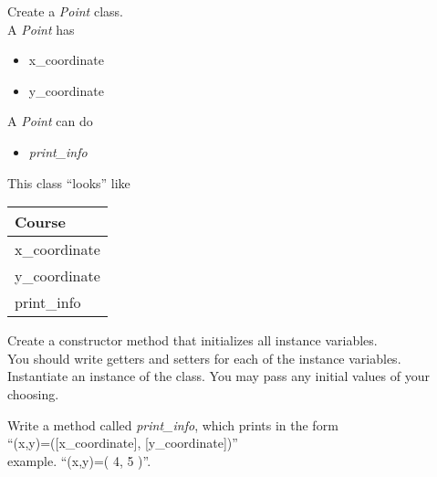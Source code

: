 \documentclass{article}
\newcommand{\tab}{\hspace*{0.25in}}
\begin{document}
\begin{enumerate}
	\begin{minipage}{.6\textwidth}
	\item Create a \textit{Point} class.\\		
		A \textit{Point} has
		\begin{itemize}
			\item x\_coordinate 
			\item y\_coordinate 
		\end{itemize}

		A \textit{Point} can do
		\begin{itemize}
			\item \textit{print\_info}
		\end{itemize}
	\end{minipage}
	\begin{minipage}{.4\textwidth}
		This class ``looks'' like 
				
		\vspace*{1em}
		\begin{tabular}{|l|}
			\hline Course\\ \hline
			x\_coordinate\\ y\_coordinate\\ \hline
			print\_info\\  \hline
		\end{tabular}
	\end{minipage}

	\vspace*{2ex}
	Create a constructor method that initializes all instance variables.\\
	You should write getters and setters for each of the instance variables.\\
	Instantiate an instance of the class. You may pass any initial values of your choosing.

	Write a method called \textit{print\_info}, which prints in the form \\
		\tab \tab \tab ``(x,y)=([x\_coordinate], [y\_coordinate])''\\
	example. ``(x,y)=( 4, 5 )''.\\



\end{enumerate}
\end{document}
